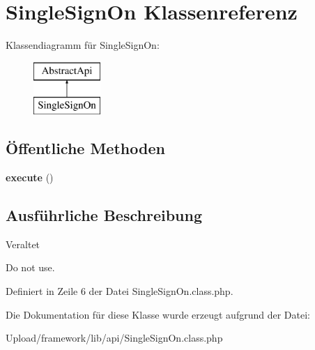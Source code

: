 \hypertarget{class_single_sign_on}{}\section{Single\+Sign\+On Klassenreferenz}
\label{class_single_sign_on}
Klassendiagramm für Single\+Sign\+On\+:\begin{figure}[H]
\begin{center}
\leavevmode
\includegraphics[height=2.000000cm]{class_single_sign_on}
\end{center}
\end{figure}
\subsection*{Öffentliche Methoden}
\begin{DoxyCompactItemize}
\item 
\mbox{\label{class_single_sign_on_a2881f83754f805bc48bd7eea48df5f87}} 
{\bfseries execute} ()
\end{DoxyCompactItemize}


\subsection{Ausführliche Beschreibung}
\begin{DoxyRefDesc}{Veraltet}
\item[\mbox{\hyperlink{deprecated__deprecated000002}{Veraltet}}]Do not use. \end{DoxyRefDesc}


Definiert in Zeile 6 der Datei Single\+Sign\+On.\+class.\+php.



Die Dokumentation für diese Klasse wurde erzeugt aufgrund der Datei\+:\begin{DoxyCompactItemize}
\item 
Upload/framework/lib/api/Single\+Sign\+On.\+class.\+php\end{DoxyCompactItemize}

